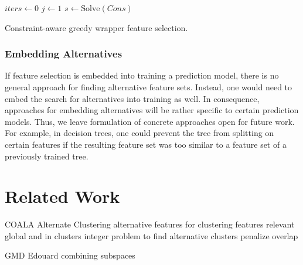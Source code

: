 \documentclass{article}
\theoremstyle{definition}
\begin{document}
\begin{algorithm}[htb]
	\DontPrintSemicolon
	\BlankLine
	$iters \leftarrow 0$ 
	$j \leftarrow 1$ 
	$s \leftarrow \text{Solve}(Cons)$ 
	\caption{Constraint-aware greedy wrapper feature selection.}
	\label{al:greedy-wrapper}
\end{algorithm}

\subsubsection{Embedding Alternatives}
\label{sec:approach:objectives:embedding}

If feature selection is embedded into training a prediction model, there is no general approach for finding alternative feature sets.
Instead, one would need to embed the search for alternatives into training as well.
In consequence, approaches for embedding alternatives will be rather specific to certain prediction models.
Thus, we leave formulation of concrete approaches open for future work.
For example, in decision trees, one could prevent the tree from splitting on certain features if the resulting feature set was too similar to a feature set of a previously trained tree.

\section{Related Work}
\label{sec:related-work}

COALA \cite{bae2006coala}
Alternate Clustering \cite{bailey2014alternative}
alternative features for clustering \cite{tao2012novel}
features relevant global and in clusters \cite{guan2011unified}
integer problem to find alternative clusters \cite{bae2010clustering}
penalize overlap \cite{mueller2009relevant}

GMD \cite{trittenbach2019dimension}
Edouard \cite{fouche2021efficient}
combining subspaces \cite{nguyen20134s}
\end{document}
